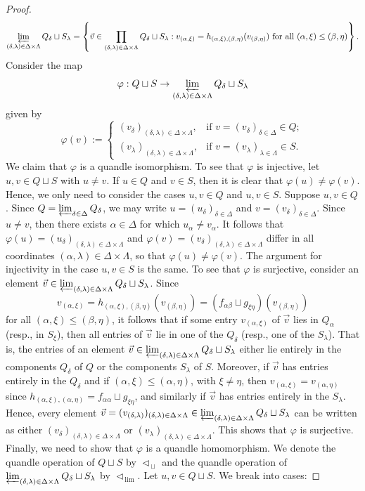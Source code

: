 \documentclass[reqno,dvipsnames]{amsart}
\renewcommand{\l}{\left}
\renewcommand{\r}{\right}
\renewcommand{\d}{\delta}
\renewcommand{\a}{\alpha}
\renewcommand{\b}{\beta}
\newcommand{\tll}{\triangleleft_{\,\lim}}
\newcommand{\tlsq}{\triangleleft_{\,\sqcup}}
\renewcommand{\phi}{\varphi}
\theoremstyle{definition}
\begin{document}
{\begin{proof}
\begingroup\makeatletter{}\check@mathfonts
\[\varprojlim_{(\d,\lambda)\in\Delta\times\Lambda}Q_\d\sqcup S_\lambda=\l\{\vec{v}\in\prod_{(\d,\lambda)\in\Delta\times\Lambda}Q_\d\sqcup S_\lambda:v_{(\a,\xi)}=h_{(\a,\xi),(\b,\eta)}(v_{(\b,\eta)})\text{ for all }(\a,\xi)\leq(\b,\eta)\r\}.\]
\endgroup
Consider the map
\[\phi:Q\sqcup S\to\varprojlim_{(\d,\lambda)\in\Delta\times\Lambda}Q_\d\sqcup S_\lambda\]
given by
\[\phi(v):=\begin{cases}(v_\d)_{(\d,\lambda)\in\Delta\times\Lambda},&\text{if }v=(v_\d)_{\d\in\Delta}\in Q;\\(v_\lambda)_{(\d,\lambda)\in\Delta\times\Lambda},&\text{if }v=(v_\lambda)_{\lambda\in\Lambda}\in S.\end{cases}\]
We claim that $\phi$ is a quandle isomorphism. To see that $\phi$ is injective, let $u,v\in Q\sqcup S$ with $u\neq v$. If $u\in Q$ and $v\in S$, then it is clear that $\phi(u)\neq\phi(v)$. Hence, we only need to consider the cases $u,v\in Q$ and $u,v\in S$. Suppose $u,v\in Q$. Since $Q=\varprojlim_{\d\in\Delta}Q_\d$, we may write $u=(u_\d)_{\d\in\Delta}$ and $v=(v_\d)_{\d\in\Delta}$. Since $u\neq v$, then there exists $\a\in\Delta$ for which $u_\a\neq v_\a$. It follows that $\phi(u)=(u_\d)_{(\d,\lambda)\in\Delta\times\Lambda}$ and $\phi(v)=(v_\d)_{(\d,\lambda)\in\Delta\times\Lambda}$ differ in all coordinates $(\a,\lambda)\in\Delta\times\Lambda$, so that $\phi(u)\neq\phi(v)$. The argument for injectivity in the case $u,v\in S$ is the same. To see that $\phi$ is surjective, consider an element $\vec{v}\in\varprojlim_{(\d,\lambda)\in\Delta\times\Lambda}Q_\d\sqcup S_\lambda$. Since
\[v_{(\a,\xi)}=h_{(\a,\xi),(\b,\eta)}(v_{(\b,\eta)})=(f_{\a\b}\sqcup g_{\xi\eta})(v_{(\b,\eta)})\]
for all $(\a,\xi)\leq(\b,\eta)$, it follows that if some entry $v_{(\a,\xi)}$ of $\vec{v}$ lies in $Q_\a$ (resp., in $S_\xi$), then all entries of $\vec{v}$ lie in one of the $Q_\d$ (resp., one of the $S_\lambda$). That is, the entries of an element $\vec{v}\in\varprojlim_{(\d,\lambda)\in\Delta\times\Lambda}Q_\d\sqcup S_\lambda$ either lie entirely in the components $Q_\d$ of $Q$ or the components $S_\lambda$ of $S$. Moreover, if $\vec{v}$ has entries entirely in the $Q_\d$ and if $(\a,\xi)\leq(\a,\eta)$, with $\xi\neq\eta$, then $v_{(\a,\xi)}=v_{(\a,\eta)}$ since $h_{(\a,\xi),(\a,\eta)}=f_{\a\a}\sqcup g_{\xi\eta}$, and similarly if $\vec{v}$ has entries entirely in the $S_\lambda$. Hence, every element $\vec{v}=(v_{(\d,\lambda)})_{(\d,\lambda)\in\Delta\times\Lambda}\in\varprojlim_{(\d,\lambda)\in\Delta\times\Lambda}Q_\d\sqcup S_\lambda$ can be written as either $(v_\d)_{(\d,\lambda)\in\Delta\times\Lambda}$ or $(v_\lambda)_{(\d,\lambda)\in\Delta\times\Lambda}$. This shows that $\phi$ is surjective. Finally, we need to show that $\phi$ is a quandle homomorphism. We denote the quandle operation of $Q\sqcup S$ by $\tlsq$ and the quandle operation of $\varprojlim_{(\d,\lambda)\in\Delta\times\Lambda}Q_\d\sqcup S_\lambda$ by $\tll$. Let $u,v\in Q\sqcup S$. We break into cases:


\end{proof}}
\end{document}

